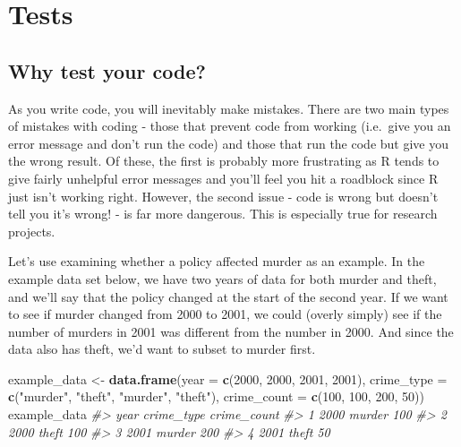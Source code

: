 \documentclass[
  12pt,
]{book}
\newenvironment{Shaded}{\begin{snugshade}}{\end{snugshade}}
\newcommand{\CommentTok}[1]{\textcolor[rgb]{0.37,0.37,0.37}{\textit{#1}}}
\newcommand{\DataTypeTok}[1]{\textcolor[rgb]{0.27,0.27,0.27}{#1}}
\newcommand{\DecValTok}[1]{\textcolor[rgb]{0.06,0.06,0.06}{#1}}
\newcommand{\KeywordTok}[1]{\textcolor[rgb]{0.27,0.27,0.27}{\textbf{#1}}}
\newcommand{\NormalTok}[1]{#1}
\newcommand{\StringTok}[1]{\textcolor[rgb]{0.5,0.5,0.5}{#1}}
\begin{document}
\hypertarget{tests}{%
\chapter{Tests}\label{tests}}

\hypertarget{why-test-your-code}{%
\section{Why test your code?}\label{why-test-your-code}}

As you write code, you will inevitably make mistakes. There are two main types of mistakes with coding - those that prevent code from working (i.e.~give you an error message and don't run the code) and those that run the code but give you the wrong result. Of these, the first is probably more frustrating as R tends to give fairly unhelpful error messages and you'll feel you hit a roadblock since R just isn't working right. However, the second issue - code is wrong but doesn't tell you it's wrong! - is far more dangerous. This is especially true for research projects.

Let's use examining whether a policy affected murder as an example. In the example data set below, we have two years of data for both murder and theft, and we'll say that the policy changed at the start of the second year. If we want to see if murder changed from 2000 to 2001, we could (overly simply) see if the number of murders in 2001 was different from the number in 2000. And since the data also has theft, we'd want to subset to murder first.

\begin{Shaded}
\begin{Highlighting}[]
\NormalTok{example\_data <{-}}\StringTok{ }\KeywordTok{data.frame}\NormalTok{(}\DataTypeTok{year =} \KeywordTok{c}\NormalTok{(}\DecValTok{2000}\NormalTok{, }\DecValTok{2000}\NormalTok{, }\DecValTok{2001}\NormalTok{, }\DecValTok{2001}\NormalTok{),}
                           \DataTypeTok{crime\_type =} \KeywordTok{c}\NormalTok{(}\StringTok{"murder"}\NormalTok{, }\StringTok{"theft"}\NormalTok{, }\StringTok{"murder"}\NormalTok{, }\StringTok{"theft"}\NormalTok{),}
                           \DataTypeTok{crime\_count =} \KeywordTok{c}\NormalTok{(}\DecValTok{100}\NormalTok{, }\DecValTok{100}\NormalTok{, }\DecValTok{200}\NormalTok{, }\DecValTok{50}\NormalTok{))}
\NormalTok{example\_data}
\CommentTok{\#>   year crime\_type crime\_count}
\CommentTok{\#> 1 2000     murder         100}
\CommentTok{\#> 2 2000      theft         100}
\CommentTok{\#> 3 2001     murder         200}
\CommentTok{\#> 4 2001      theft          50}
\end{Highlighting}
\end{Shaded}
\end{document}
